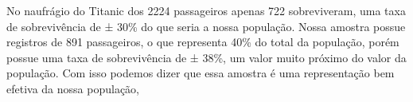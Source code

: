 \documentclass[11pt]{article}
\begin{document}
No naufrágio do Titanic dos 2224 passageiros apenas 722 sobreviveram,
uma taxa de sobrevivência de ± 30\% do que seria a nossa população.
Nossa amostra possue registros de 891 passageiros, o que representa 40\%
do total da população, porém possue uma taxa de sobrevivência de ± 38\%,
um valor muito próximo do valor da população. Com isso podemos dizer que
essa amostra é uma representação bem efetiva da nossa população,


    
    
    
    
\end{document}
